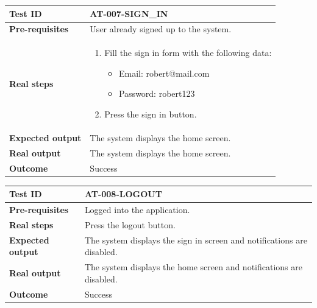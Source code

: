 \begin{table}[H]
    \centering
    \begin{tabular}{p{3cm}p{10cm}}
    \textbf{Test ID} & AT-007-SIGN\_IN \\ \hline
    \textbf{Pre-requisites} & User already signed up to the system. \\ \hline
    \textbf{Real steps} & 
        \begin{enumerate} \itemsep0em
            \item Fill the sign in form with the following data:
            \begin{itemize}[label={}] \itemsep0em
                \item Email: robert@mail.com
                \item Password: robert123
            \end{itemize}
            \item Press the sign in button.
        \end{enumerate} \\ \hline
    \textbf{Expected output} & The system displays the home screen. \\ \hline
    \textbf{Real output} & The system displays the home screen. \\ \hline
    \textbf{Outcome} & Success \\ \hline
    \end{tabular}
\end{table}

\begin{table}[H]
    \centering
    \begin{tabular}{p{3cm}p{10cm}}
    \textbf{Test ID} & AT-008-LOGOUT \\ \hline
    \textbf{Pre-requisites} & Logged into the application. \\ \hline
    \textbf{Real steps} & Press the logout button. \\ \hline
    \textbf{Expected output} & The system displays the sign in screen and notifications are disabled. \\ \hline
    \textbf{Real output} & The system displays the home screen and notifications are disabled. \\ \hline
    \textbf{Outcome} & Success \\ \hline
    \end{tabular}
\end{table}

